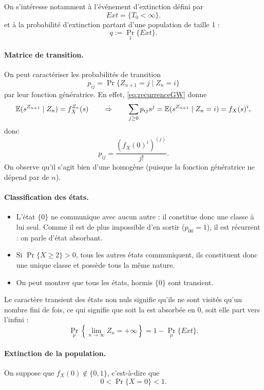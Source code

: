 \bigskip
On s'intéresse notamment à l'événement d'extinction défini par 
$$
Ext = \{T_0 < \infty\}.
$$
et à la probabilité d'extinction partant d'une population de taille 1 : 
$$
q := \Pr_1\{Ext\}.
$$


\paragraph*{Matrice de transition.} 
On peut caractériser les probabilités de transition 
$$
p_{ij} = \Pr\{Z_{n+1} = j \mid Z_n = i\}
$$
par leur fonction génératrice. En effet, \eqref{eq:recurrenceGW} donne
$$
\operatorname{\mathbb{E}}(s^{Z_{n+1}} \mid Z_n) = f_X^{Z_n}(s)
\qquad \Rightarrow \qquad 
\sum_{j \geq 0} p_{ij} s^j = \operatorname{\mathbb{E}}(s^{Z_{n+1}} \mid Z_n=i) = f_X(s)^i,
$$
donc
$$
p_{ij} = \frac{\left(f_X(0)^i\right)^{(j)}}{j!}.
$$
On observe qu'il s'agit bien d'une \cM homogène (puisque la fonction génératrice ne dépend par de $n$).

\paragraph*{Classification des états.} 
\begin{itemize}
 \item L'état $\{0\}$ ne communique avec aucun autre : il constitue donc une classe à lui seul. Comme il est de plus impossible d'en sortir ($p_{00} = 1$), il est récurrent : on parle d'état absorbant.
 \item Si $\Pr\{X \geq 2\} > 0$, tous les autres états communiquent, ils constituent donc une unique classe et possède tous la même nature.
 \item On peut montrer que tous les états, hormis $\{0\}$ sont transient.
\end{itemize}

Le caractère transient des états non nuls signifie qu'ils ne sont visités qu'un nombre fini de fois, ce qui signifie que soit la \cM est absorbée en 0, soit elle part vers l'infini : 
$$
\Pr_\mu\left\{ \lim_{n \to \infty} Z_n = + \infty\right\} = 1 - \Pr_\mu\{Ext\}.
$$

\paragraph*{Extinction de la population.} 
On suppose que $f_X(0) \notin \{0, 1\}$, c'est-à-dire que 
$$
0 < \Pr\{X = 0\} < 1.
$$

